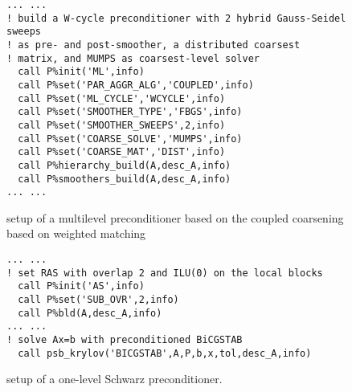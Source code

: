 \begin{figure}[h!]
\begin{center}
\begin{minipage}{.90\textwidth}
{\small
\begin{verbatim}
... ...
! build a W-cycle preconditioner with 2 hybrid Gauss-Seidel sweeps
! as pre- and post-smoother, a distributed coarsest
! matrix, and MUMPS as coarsest-level solver
  call P%init('ML',info)
  call P%set('PAR_AGGR_ALG','COUPLED',info)
  call P%set('ML_CYCLE','WCYCLE',info)
  call P%set('SMOOTHER_TYPE','FBGS',info)
  call P%set('SMOOTHER_SWEEPS',2,info)
  call P%set('COARSE_SOLVE','MUMPS',info)
  call P%set('COARSE_MAT','DIST',info)
  call P%hierarchy_build(A,desc_A,info)
  call P%smoothers_build(A,desc_A,info)
... ...
\end{verbatim}
}
\end{minipage}
\caption{setup of a multilevel preconditioner based on the coupled coarsening based on weighted matching\label{fig:ex3}}
\end{center}
\end{figure}

\begin{figure}[h!]
\begin{center}
\begin{minipage}{.90\textwidth}
{\small
\begin{verbatim}
... ...
! set RAS with overlap 2 and ILU(0) on the local blocks
  call P%init('AS',info)
  call P%set('SUB_OVR',2,info)
  call P%bld(A,desc_A,info)
... ...
! solve Ax=b with preconditioned BiCGSTAB
  call psb_krylov('BICGSTAB',A,P,b,x,tol,desc_A,info)
\end{verbatim}
}
\end{minipage}
\caption{setup of a one-level Schwarz preconditioner.\label{fig:ex4}}
\end{center}
\end{figure}


